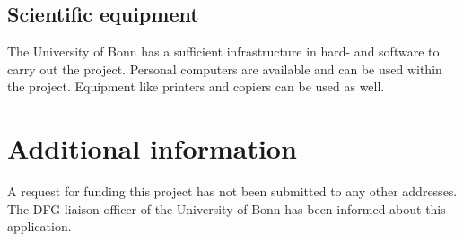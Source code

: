 \documentclass[a4paper,12pt]{article}
\begin{document}
\subsection{Scientific equipment}
The University of Bonn has a sufficient infrastructure in hard- and software to carry out the project. Personal computers are available and can be used within the project. Equipment like printers and copiers can be used as well.





\section{Additional information}

A request for funding this project has not been submitted to any other addresses. The DFG liaison officer of the University of Bonn has been informed about this application.
\end{document}
